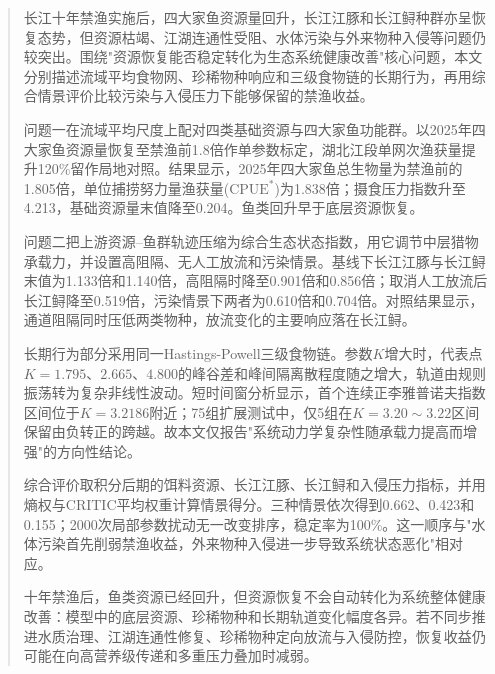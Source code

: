 
\begin{abstract}
长江十年禁渔实施后，四大家鱼资源量回升，长江江豚和长江鲟种群亦呈恢复态势，但资源枯竭、江湖连通性受阻、水体污染与外来物种入侵等问题仍较突出。围绕"资源恢复能否稳定转化为生态系统健康改善"核心问题，本文分别描述流域平均食物网、珍稀物种响应和三级食物链的长期行为，再用综合情景评价比较污染与入侵压力下能够保留的禁渔收益。

问题一在流域平均尺度上配对四类基础资源与四大家鱼功能群。以2025年四大家鱼资源量恢复至禁渔前1.8倍作单参数标定，湖北江段单网次渔获量提升120\%留作局地对照。结果显示，2025年四大家鱼总生物量为禁渔前的1.805倍，单位捕捞努力量渔获量($\mathrm{CPUE}^*$)为1.838倍；摄食压力指数升至4.213，基础资源量末值降至0.204。鱼类回升早于底层资源恢复。

问题二把上游资源--鱼群轨迹压缩为综合生态状态指数，用它调节中层猎物承载力，并设置高阻隔、无人工放流和污染情景。基线下长江江豚与长江鲟末值为1.133倍和1.140倍，高阻隔时降至0.901倍和0.856倍；取消人工放流后长江鲟降至0.519倍，污染情景下两者为0.610倍和0.704倍。对照结果显示，通道阻隔同时压低两类物种，放流变化的主要响应落在长江鲟。

长期行为部分采用同一Hastings-Powell三级食物链。参数$K$增大时，代表点$K=1.795$、$2.665$、$4.800$的峰谷差和峰间隔离散程度随之增大，轨道由规则振荡转为复杂非线性波动。短时间窗分析显示，首个连续正李雅普诺夫指数区间位于$K=3.2186$附近；75组扩展测试中，仅5组在$K=3.20\sim3.22$区间保留由负转正的跨越。故本文仅报告"系统动力学复杂性随承载力提高而增强"的方向性结论。

综合评价取积分后期的饵料资源、长江江豚、长江鲟和入侵压力指标，并用熵权与CRITIC平均权重计算情景得分。三种情景依次得到0.662、0.423和0.155；2000次局部参数扰动无一改变排序，稳定率为100\%。这一顺序与"水体污染首先削弱禁渔收益，外来物种入侵进一步导致系统状态恶化"相对应。

十年禁渔后，鱼类资源已经回升，但资源恢复不会自动转化为系统整体健康改善：模型中的底层资源、珍稀物种和长期轨道变化幅度各异。若不同步推进水质治理、江湖连通性修复、珍稀物种定向放流与入侵防控，恢复收益仍可能在向高营养级传递和多重压力叠加时减弱。
\end{abstract}

